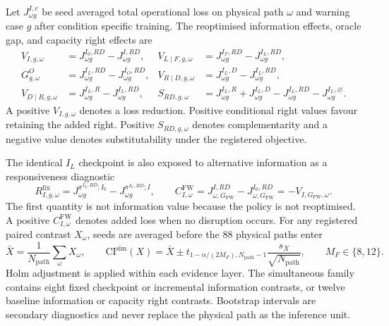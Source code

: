 \documentclass[a4paper,fleqn]{cas-sc}
\begin{document}
Let $J_{\omega g}^{I,c}$ be seed averaged total operational loss on physical
path $\omega$ and warning case $g$ after condition specific training. The
reoptimised information effects, oracle gap, and capacity right effects are
\begin{subequations}\label{eq:information-capacity-values-524}
\begin{align}
 V_{I,g,\omega}&=J_{\omega g}^{I_0,RD}-J_{\omega g}^{I,RD},
 &V_{L\mid F,g,\omega}&=J_{\omega g}^{I_F,RD}-J_{\omega g}^{I_L,RD},\\
 G^O_{g,\omega}&=J_{\omega g}^{I_L,RD}-J_{\omega g}^{I_O,RD},
 &V_{R\mid D,g,\omega}&=J_{\omega g}^{I_L,D}-J_{\omega g}^{I_L,RD},\\
 V_{D\mid R,g,\omega}&=J_{\omega g}^{I_L,R}-J_{\omega g}^{I_L,RD},
 &S_{RD,g,\omega}&=J_{\omega g}^{I_L,R}+J_{\omega g}^{I_L,D}
 -J_{\omega g}^{I_L,RD}-J_{\omega g}^{I_L,\varnothing}.
\end{align}
\end{subequations}
A positive $V_{I,g,\omega}$ denotes a loss reduction. Positive conditional
right values favour retaining the added right. Positive $S_{RD,g,\omega}$
denotes complementarity and a negative value denotes substitutability under the
registered objective.

The identical $I_L$ checkpoint is also exposed to alternative information as a
responsiveness diagnostic
\begin{equation}
 R^{\mathrm{fix}}_{I,g,\omega}
 =J_{\omega g}^{\pi^{I_L,RD};I_0}
 -J_{\omega g}^{\pi^{I_L,RD};I},
 \qquad
 C^{\mathrm{FW}}_{I,\omega}
 =J_{\omega,G_{\mathrm{FW}}}^{I,RD}
 -J_{\omega,G_{\mathrm{FW}}}^{I_0,RD}
 =-V_{I,G_{\mathrm{FW}},\omega}.
 \label{eq:information-diagnostics-524}
\end{equation}
The first quantity is not information value because the policy is not
reoptimised. A positive $C^{\mathrm{FW}}_{I,\omega}$ denotes added loss when no
disruption occurs. For any registered paired contrast $X_\omega$, seeds are
averaged before the 88 physical paths enter
\begin{equation}
 \bar X=\frac{1}{N_{\mathrm{path}}}\sum_\omega X_\omega,
 \qquad
 \mathrm{CI}^{\mathrm{sim}}(X)
 =\bar X\mathbin{\pm}
 t_{1-\alpha/(2M_F),N_{\mathrm{path}}-1}
 \frac{s_X}{\sqrt{N_{\mathrm{path}}}},
 \qquad M_F\in\{8,12\}.
 \label{eq:information-inference-524}
\end{equation}
Holm adjustment is applied within each evidence layer. The simultaneous family
contains eight fixed checkpoint or incremental information contrasts, or twelve
baseline information or capacity right contrasts. Bootstrap intervals are
secondary diagnostics and never replace the physical path as the inference
unit.
\end{document}
